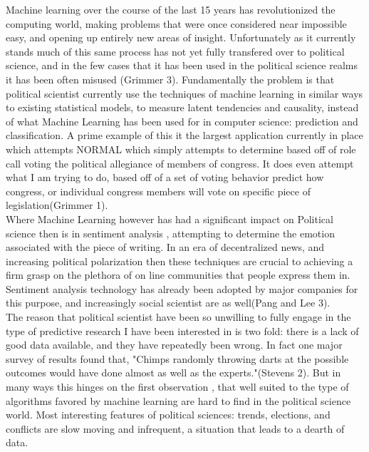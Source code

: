 \documentclass[12pt]{article}
\begin{document}
	Machine learning over the course of the last 15 years has revolutionized the computing world, making problems that were once considered near impossible easy, and opening up entirely new areas of insight. Unfortunately as it currently stands much of this same process has not yet fully transfered over to political science, and in the few cases that it has been used in the political science realms it has been often misused (Grimmer 3). Fundamentally the problem is that political scientist currently use the techniques of machine learning in similar ways to existing statistical models, to measure latent tendencies and causality, instead of what Machine Learning has been used for in computer science: prediction and classification. A prime example of this it the largest application currently in place which attempts NORMAL which simply attempts to determine based off of role call voting the political allegiance of members of congress. It does even attempt what I am trying to do, based off of a set of voting behavior predict how congress, or individual congress members will vote on specific piece of legislation(Grimmer 1). \\

	Where Machine Learning however has had a significant impact on Political science then is in sentiment analysis , attempting to determine the emotion associated with the piece of writing. In an era of decentralized news, and increasing political polarization then these techniques are crucial to achieving a firm grasp on the plethora of on line communities that people express them in. Sentiment analysis technology has already been adopted by major companies for this purpose, and increasingly social scientist are as well(Pang and Lee 3). \\

	The reason that political scientist have been so unwilling to fully engage in the type of predictive research I have been interested in is two fold: there is a lack of good data available, and they have repeatedly been wrong. In fact one major survey of results found that, {"Chimps randomly throwing darts at the possible outcomes would have done almost as well as the experts."}(Stevens 2). But in many ways this hinges on the first observation , that well suited to the type of algorithms favored by machine learning are hard to find in the political science world. Most interesting features of political sciences: trends, elections, and conflicts are slow moving and infrequent, a situation that leads to a dearth of data. 
\end{document}
